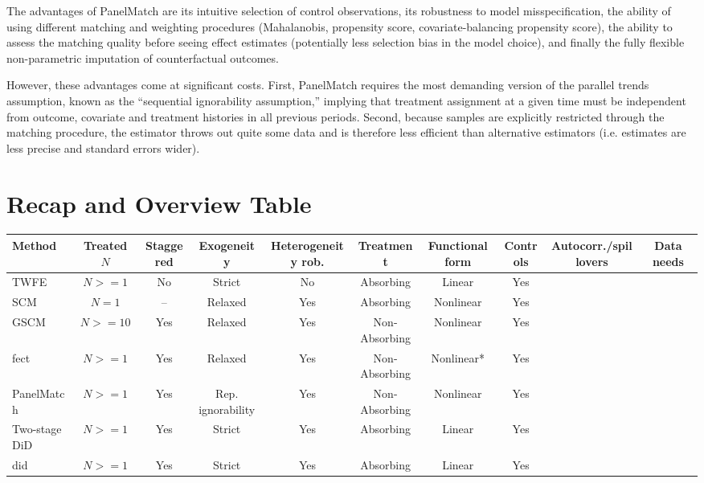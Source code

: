 \documentclass[hidelinks]{article}\usepackage[]{graphicx}\usepackage[]{xcolor}
\begin{document}
The advantages of PanelMatch are its intuitive selection of control observations, its robustness to model misspecification, the ability of using different matching and weighting procedures (Mahalanobis, propensity score, covariate-balancing propensity score), the ability to assess the matching quality before seeing effect estimates (potentially less selection bias in the model choice), and finally the fully flexible non-parametric imputation of counterfactual outcomes.

However, these advantages come at significant costs. First, PanelMatch requires the most demanding version of the parallel trends assumption, known as the ``sequential ignorability assumption,'' implying that treatment assignment at a given time must be independent from outcome, covariate and treatment histories in all previous periods. Second, because samples are explicitly restricted through the matching procedure, the estimator throws out quite some data and is therefore less efficient than alternative estimators (i.e. estimates are less precise and standard errors wider).


\section{Recap and Overview Table}


\begin{sidewaystable}
    \centering\footnotesize
    \begin{tabular}{lccccccccc}
	\toprule
	Method & Treated $N$ & Staggered & Exogeneity & Heterogeneity rob. & Treatment & Functional form & Controls & Autocorr./spillovers & Data needs \\
	\midrule
	TWFE & $N >= 1$ & No & Strict & No & Absorbing & Linear & Yes &  &  \\	
	SCM & $N = 1$ & -- & Relaxed & Yes & Absorbing & Nonlinear & Yes &  &  \\	
	GSCM & $N >= 10$ & Yes & Relaxed & Yes & Non-Absorbing & Nonlinear & Yes &  &  \\	
	fect & $N >= 1$ & Yes & Relaxed & Yes & Non-Absorbing & Nonlinear* & Yes &  &  \\	
	PanelMatch & $N >= 1$ & Yes & Rep. ignorability & Yes & Non-Absorbing & Nonlinear & Yes &  &  \\	
	Two-stage DiD & $N >= 1$ & Yes & Strict & Yes & Absorbing & Linear & Yes &  &  \\	
	did & $N >= 1$ & Yes & Strict & Yes & Absorbing & Linear & Yes &  &  \\
	\bottomrule
    \end{tabular}
\end{sidewaystable}

\printbibliography
\end{document}
